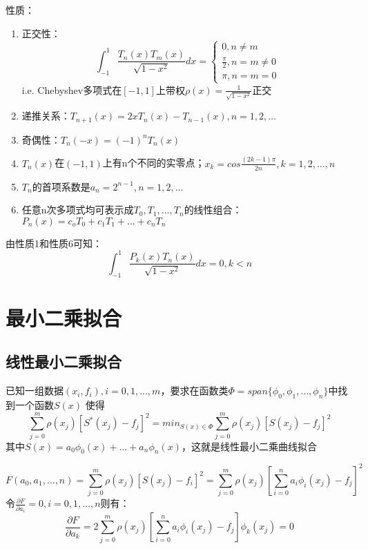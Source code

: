 \documentclass[a4paper]{article}
\begin{document}
性质：
\begin{enumerate}
    \item 正交性：
    $$\int^1_{-1} \frac{T_n(x)T_m(x)}{\sqrt{1-x^2}}dx = \left\{
        \begin{array}{lr}
            0, n \neq m \\
            \frac{\pi}{2}, n=m \neq 0 \\
            \pi, n=m=0
        \end{array}
        \right. $$
        i.e. Chebyshev多项式在$[-1,1]$上带权$\rho(x) = \frac{1}{\sqrt{1-x^2}}$正交
    \item 递推关系：$T_{n+1}(x) =2xT_n(x)-T_{n-1}(x), n=1,2,\dots $
    \item 奇偶性：$T_n(-x) = (-1)^nT_n(x) $
    \item $T_n(x)$在$(-1,1)$上有n个不同的实零点；$x_k = cos\frac{(2k-1)\pi}{2n}, k=1,2,\dots,n$
    \item $T_n$的首项系数是$a_n = 2^{n-1},n=1,2,\dots$
    \item 任意n次多项式均可表示成$T_0, T_1, \dots, T_n$的线性组合：$P_n(x) = c_oT_0 + c_1T_1 + \dots + c_nT_n$      
\end{enumerate}

由性质1和性质6可知：
$$\int^1_{-1}\frac{P_k(x)T_n(x)}{\sqrt{1-x^2}}dx = 0, k < n$$

\section{最小二乘拟合}

\subsection{线性最小二乘拟合}
已知一组数据$(x_i, f_i), i=0,1,\dots, m$，要求在函数类$\Phi = span\{\phi_0, \phi_1, \dots, \phi_n\}$中找到一个函数$S(x)$
使得
\begin{equation}
    \sum^m_{j=0}\rho(x_j)[S^*(x_j)-f_j]^2=min_{S(x)\in\Phi}\sum^m_{j=0}\rho(x_j)[S(x_j)-f_j]^2 
\end{equation}
其中$S(x)=a_0\phi_0(x)+\dots + a_n\phi_n(x)$，这就是线性最小二乘曲线拟合

\begin{equation*}
    F(a_0, a_1, \dots, n) = \sum^m_{j=0}\rho(x_j)[S(x_j)-f_i]^2 = \sum^m_{j=0}\rho(x_j)[\sum^n_{i=0}a_i\phi_i(x_j)-f_j]^2
\end{equation*}
令$\frac{\partial F}{\partial a_i} = 0, i=0,1,\dots, n$则有：
\begin{equation}
    \frac{\partial F}{\partial a_k} = 2\sum^m_{j=0}\rho(x_j)[\sum^n_{i=0}a_i\phi_i(x_j)-f_j]\phi_k(x_j) = 0  
    \label{eq:2.2}
\end{equation}
\end{document}
